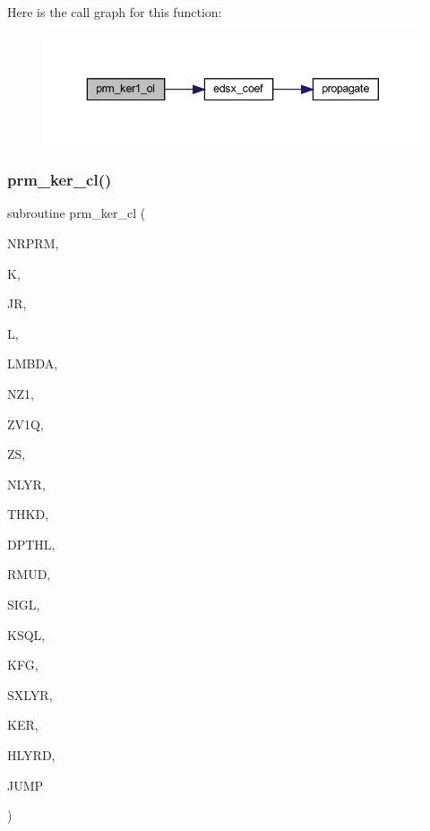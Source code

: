 Here is the call graph for this function\+:\nopagebreak
\begin{figure}[H]
\begin{center}
\leavevmode
\includegraphics[width=343pt]{Leroi__c_8f90_a98390b637677e60abaa0fa6df3249f0b_cgraph}
\end{center}
\end{figure}
\mbox{\label{Leroi__c_8f90_a04185f4ba85efc3e493f2de9019a69da}} 
\subsubsection{\texorpdfstring{prm\+\_\+ker\+\_\+cl()}{prm\_ker\_cl()}}
{\footnotesize\ttfamily subroutine prm\+\_\+ker\+\_\+cl (\begin{DoxyParamCaption}\item[{integer}]{N\+R\+P\+RM,  }\item[{integer}]{K,  }\item[{integer}]{JR,  }\item[{integer}]{L,  }\item[{real(kind=ql)}]{L\+M\+B\+DA,  }\item[{integer}]{N\+Z1,  }\item[{real(kind=ql), dimension(nz1)}]{Z\+V1Q,  }\item[{real(kind=ql)}]{ZS,  }\item[{integer}]{N\+L\+YR,  }\item[{real(kind=ql), dimension (nlyr)}]{T\+H\+KD,  }\item[{real(kind=ql), dimension (nlyr)}]{D\+P\+T\+HL,  }\item[{real(kind=ql), dimension(0\+:nlyr)}]{R\+M\+UD,  }\item[{complex(kind=ql), dimension (nlyr)}]{S\+I\+GL,  }\item[{complex(kind=ql), dimension (nlyr)}]{K\+S\+QL,  }\item[{integer}]{K\+FG,  }\item[{integer}]{S\+X\+L\+YR,  }\item[{complex (kind=ql), dimension(jnlo-\/nrprm\+:jnhi,3,nz1)}]{K\+ER,  }\item[{complex (kind=ql), dimension(nrprm,3,nz1)}]{H\+L\+Y\+RD,  }\item[{logical}]{J\+U\+MP }\end{DoxyParamCaption})}

